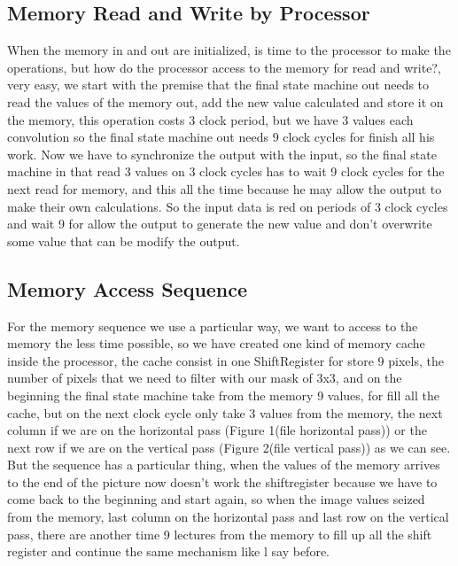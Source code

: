 \documentclass[11pt,a4paper]{article}
\begin{document}
\subsection{Memory Read and Write by Processor}
When the memory in and out are initialized, is time to the processor to make the operations, but how do the processor access to the memory for read and write?, very easy, we start with the premise that the final state machine out needs to read the values of the memory out, add the new value calculated and store it on the memory, this operation costs 3 clock period, but we have 3 values each convolution so the final state machine out needs 9 clock cycles for finish all his work. Now we have to synchronize the output with the input, so the final state machine in that read 3 values on 3 clock cycles has to wait 9 clock cycles for the next read for memory, and this all the time because he may allow the output to make their own calculations. So the input data is red on periods of 3 clock cycles and wait 9 for allow the output to generate the new value and don't overwrite some value that can be modify the output.

\subsection{Memory Access Sequence}
For the memory sequence we use a particular way, we want to access to the memory the less time possible, so we have created one kind of memory cache inside the processor, the cache consist in one ShiftRegister for store 9 pixels, the number of pixels that we need to filter with our mask of 3x3, and on the beginning the final state machine take from the memory 9 values, for fill all the cache, but on the next clock cycle only take 3 values from the memory, the next column if we are on the horizontal pass (Figure 1(file horizontal pass)) or the next row if we are on the vertical pass (Figure 2(file vertical pass)) as we can see. But the sequence has a particular thing, when the values of the memory arrives to the end of the picture now doesn't work the shiftregister because we have to come back to the beginning and start again, so when the image values seized from the memory, last column on the horizontal pass and last row on the vertical pass, there are another time 9 lectures from the memory to fill up all the shift register and continue the same mechanism like l say before.
\end{document}
